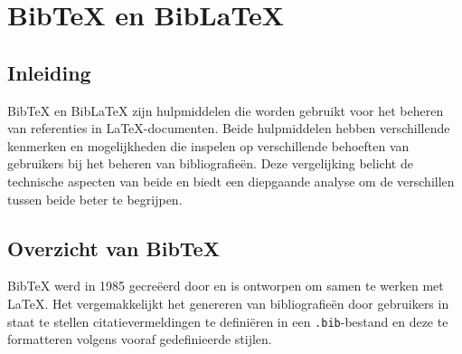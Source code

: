 
\section{BibTeX en BibLaTeX}

\subsection{Inleiding}
BibTeX en BibLaTeX zijn hulpmiddelen die worden gebruikt voor het beheren van referenties in \LaTeX{}-documenten. Beide hulpmiddelen hebben verschillende kenmerken en mogelijkheden die inspelen op verschillende behoeften van gebruikers bij het beheren van bibliografieën. Deze vergelijking belicht de technische aspecten van beide en biedt een diepgaande analyse om de verschillen tussen beide beter te begrijpen.

\subsection{Overzicht van BibTeX}
BibTeX werd in 1985 gecreëerd door \textcite{Patashnik1988} en is ontworpen om samen te werken met \LaTeX{}. Het vergemakkelijkt het genereren van bibliografieën door gebruikers in staat te stellen citatievermeldingen te definiëren in een \texttt{.bib}-bestand en deze te formatteren volgens vooraf gedefinieerde stijlen.

